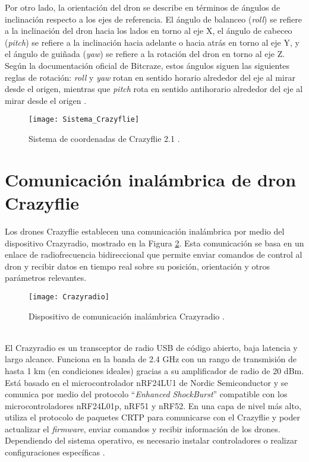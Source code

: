 Por otro lado, la orientación del dron se describe en términos de ángulos de inclinación respecto a los ejes de referencia. El ángulo de balanceo (\textit{roll}) se refiere a la inclinación del dron hacia los lados en torno al eje X, el ángulo de cabeceo (\textit{pitch}) se refiere a la inclinación hacia adelante o hacia atrás en torno al eje Y, y el ángulo de guiñada (\textit{yaw}) se refiere a la rotación del dron en torno al eje Z. Según la documentación oficial de Bitcraze, estos ángulos siguen las siguientes reglas de rotación: \textit{roll} y \textit{yaw} rotan en sentido horario alrededor del eje al mirar desde el origen, mientras que \textit{pitch} rota en sentido antihorario alrededor del eje al mirar desde el origen \cite{Sistema_Crazyflie}.

\begin{figure}[htbp]
	\centering
	\texttt{[image: Sistema\_Crazyflie]}
	\caption{Sistema de coordenadas de Crazyflie 2.1 \cite{Sistema_Crazyflie}.}
	\label{fig:Sistema_Crazyflie}
\end{figure}

\section{Comunicación inalámbrica de dron Crazyflie}
Los drones Crazyflie establecen una comunicación inalámbrica por medio del dispositivo Crazyradio, mostrado en la Figura \ref{fig:Crazyradio}. Esta comunicación se basa en un enlace de radiofrecuencia bidireccional que permite enviar comandos de control al dron y recibir datos en tiempo real sobre su posición, orientación y otros parámetros relevantes.

\begin{figure}[htbp]
	\centering
	\texttt{[image: Crazyradio]}
	\caption{Dispositivo de comunicación inalámbrica Crazyradio \cite{Crazyradio}.}
	\label{fig:Crazyradio}
\end{figure}
\\ El Crazyradio es un transceptor de radio USB de código abierto, baja latencia y largo alcance. Funciona en la banda de 2.4 GHz con un rango de transmisión de hasta 1 km (en condiciones ideales) gracias a su amplificador de radio de 20 dBm. Está basado en el microcontrolador nRF24LU1 de Nordic Semiconductor y se comunica por medio del protocolo “\textit{Enhanced ShockBurst}” compatible con los microcontroladores nRF24L01p, nRF51 y nRF52. En una capa de nivel más alto, utiliza el protocolo de paquetes CRTP para comunicarse con el Crazyflie y poder actualizar el \textit{firmware}, enviar comandos y recibir información de los drones. Dependiendo del sistema operativo, es necesario instalar controladores o realizar configuraciones específicas \cite{Crazyradio}.


